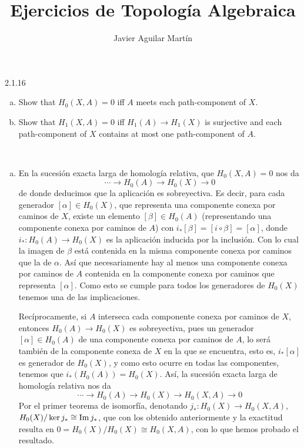 \documentclass[twoside]{article}
\begin{document}
\title{Ejercicios de Topología Algebraica}
\author{Javier Aguilar Martín}
\maketitle

\begin{ejercicio}{2.1.16}\
\begin{enumerate}[(a)]
\item Show that $H_0(X,A) = 0$ iff $A$ meets each path-component of $X$.
\item Show that $H_1(X,A) = 0$ iff $H_1(A)→H_1(X)$ is surjective and each path-component
of $X$ contains at most one path-component of $A$.
\end{enumerate}
 

\end{ejercicio}
\begin{solucion}\
\begin{enumerate}[(a)]
\item En la sucesión exacta larga de homología relativa, que $H_0(X,A)=0$ nos da
\[
\cdots\to H_0(A)\to H_0(X)\to 0
\]
de donde deducimos que la aplicación es sobreyectiva. Es decir, para cada generador $[\alpha]\in H_0(X)$, que representa una componente conexa por caminos de $X$, existe un elemento $[\beta]\in H_0(A)$ (representando una componente conexa por caminos de $A$) con $i_*[\beta]=[i\circ \beta]=[\alpha]$, donde $i_*:H_0(A)\to H_0(X)$ es la aplicación inducida por la inclusión. Con lo cual la imagen de $\beta$ está contenida en la misma componente conexa por caminos que la de $\alpha$. Así que necesariamente hay al menos una componente conexa por caminos de $A$ contenida en la componente conexa por caminos que representa $[\alpha]$. Como esto se cumple para todos los generadores de $H_0(X)$ tenemos una de las implicaciones.

Recíprocamente, si $A$ interseca cada componente conexa por caminos de $X$, entonces $H_0(A)\to H_0(X)$ es sobreyectiva, pues un generador $[\alpha]\in H_0(A)$ de una componente conexa por caminos de $A$, lo será también de la componente conexa de $X$ en la que se encuentra, esto es, $i_*[\alpha]$ es generador de $H_0(X)$, y como esto ocurre en todas las componentes, tenemos que $i_*(H_0(A))=H_0(X)$. Así, la sucesión exacta larga de homología relativa nos da 
\[
\cdots\to H_0(A)\to H_0(X)\to H_0(X,A)\to 0
\]
Por el primer teorema de isomorfía, denotando $j_*:H_0(X)\to H_0(X,A)$,  $H_0(X)/\ker j_*\cong \operatorname{Im} j_*$, que con los obtenido anteriormente y la exactitud resulta en $0=H_0(X)/H_0(X)\cong H_0(X,A)$, con lo que hemos probado el resultado. 




\end{enumerate}
\end{solucion}
\end{document}

